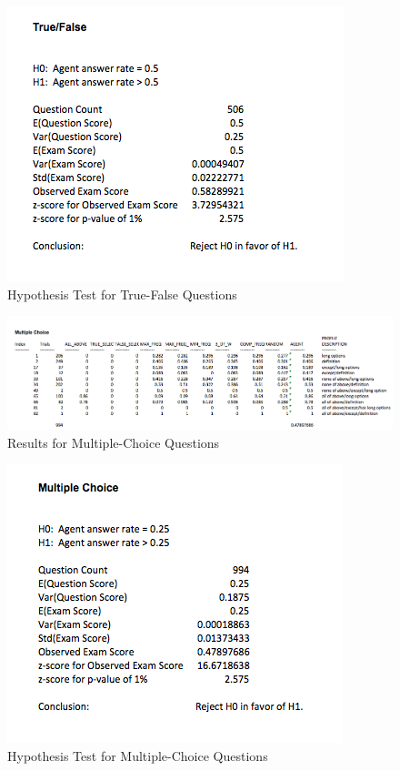 \begin{figure}
\centering
\includegraphics[scale=0.75]{true_false_hypothesis_test_1500.png}
\caption{Hypothesis Test for True-False Questions}
\label{fig:hypothesis_test_for_true_false_questions}
\end{figure}

\begin{figure}
\centering
\includegraphics[width=130mm]{multiple_choice_results_1500.png}
\caption{Results for Multiple-Choice Questions}
\label{fig:results_for_multiple_choice_questions}
\end{figure}

\begin{figure}
\centering
\includegraphics[scale=0.75]{multiple_choice_hypothesis_test_1500.png}
\caption{Hypothesis Test for Multiple-Choice Questions}
\label{fig:hypothesis_test_for_multiple_choice_questions}
\end{figure}
 

